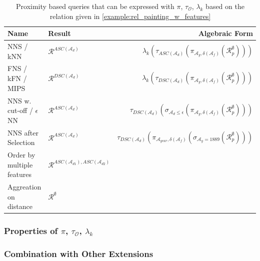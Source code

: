 \begin{table}[tb]
    \centering
    \caption{Proximity based queries that can be expressed with $\pi$, $\tau_{\mathcal{O}}$, $\lambda_k$ based on the relation given in \cref{example:rel_painting_w_features} }
    \label{table:proximity_based_queries}
    \begin{tabular}{||l l r ||} 
     \hline
     Name & Result & Algebraic Form \\
     \hline\hline
     NNS / kNN & $\mathcal{R}^{ASC(\mathcal{A}_d)}$ & $\lambda_k (\tau_{ASC(\mathcal{A}_d)} ( \pi_{\mathcal{A}_{y}, \delta(\mathcal{A}_{f})}  ( \mathcal{R}_p^{\emptyset})))$  \\ 
     \hline
     FNS / kFN / MIPS & $\mathcal{R}^{DSC(\mathcal{A}_d)}$ & $\lambda_k (\tau_{DSC(\mathcal{A}_d)} ( \pi_{\mathcal{A}_{y}, \delta(\mathcal{A}_{f})}  ( \mathcal{R}_p^{\emptyset})))$   \\
     \hline
     NNS w. cut-off / $\epsilon$NN & $\mathcal{R}^{ASC(\mathcal{A}_d)}$ & $\tau_{DSC(\mathcal{A}_d)} ( \sigma_{\mathcal{A}_d \leq \epsilon} ( \pi_{\mathcal{A}_{y}, \delta(\mathcal{A}_{f})} ( \mathcal{R}_p^{\emptyset})) )$  \\
     \hline
     NNS after Selection & $\mathcal{R}^{ASC(\mathcal{A}_d)}$ &  $\tau_{DSC(\mathcal{A}_d)} ( \pi_{\mathcal{A}_{year}, \delta(\mathcal{A}_{f})} ( \sigma_{\mathcal{A}_{y} = 1889} ( \mathcal{R}_p^{\emptyset})) )$\\
     \hline
     Order by multiple features & $\mathcal{R}^{ASC(\mathcal{A}_{d1}),ASC(\mathcal{A}_{d2})}$ & \\ 
     \hline
     Aggreation on distance & $\mathcal{R}^{\emptyset}$ & \\ 
     \hline
    \end{tabular}
\end{table}


\subsubsection{Properties of $\pi$, $\tau_{\mathcal{O}}$, $\lambda_k$}


\subsubsection{Combination with Other Extensions}


